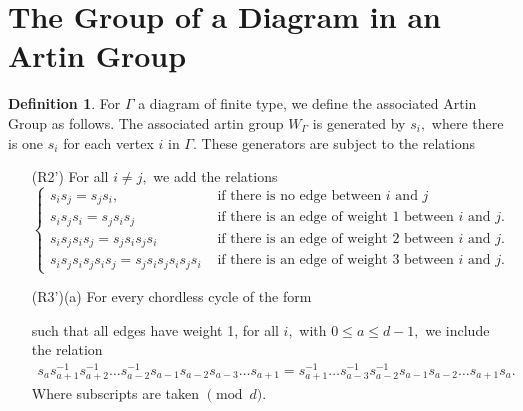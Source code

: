 \documentclass[11pt]{amsart}
\theoremstyle{definition}
\newtheorem{defn}[thm]{Definition}
\begin{document}
\section{The Group of a Diagram in an Artin Group}
\label{sec:defn_artingroup}

\begin{defn} \label{grp def}
For $\Gamma$ a diagram of finite type, we define the associated Artin Group as follows. The associated artin group $W_\Gamma$ is generated by $s_i,$ where there is one $s_i$ for each vertex $i$ in $\Gamma.$ These generators are subject to the relations
\begin{itemize}
	\item[(R2')] For all $i \neq j,$ we add the relations
	\\
$	\begin{cases}
	s_is_j=s_js_i, &\text{ if there is no edge between $i$ and $j$}\\
	s_is_js_i = s_js_is_j &\text{ if there is an edge of weight 1 between $i$ and $j.$}\\
	s_is_js_is_j = s_js_is_js_i &\text{ if there is an edge of weight 2 between $i$ and $j$.}\\
	s_is_js_is_js_is_j = s_js_is_js_is_js_i &\text{ if there is an edge of weight 3 between $i$ and $j$.}
\end{cases}$
\item[(R3')(a)] For every chordless cycle of the form


such that all edges have weight 1, for all $i,$ with $0 \leq a \leq d-1,$ we include the relation 
\begin{align*}
	s_{a}s_{a+1}^{-1}s_{a+2}^{-1}\dots s_{a-2}^{-1}s_{a-1}s_{a-2}s_{a-3}\dots s_{a+1} = s_{a+1}^{-1}\dots s_{a-3}^{-1}s_{a-2}^{-1}s_{a-1}s_{a-2}\dots s_{a+1}s_{a}.
\end{align*}
Where subscripts are taken $\pmod d.$ 


\end{itemize}
\end{defn}
\end{document}
